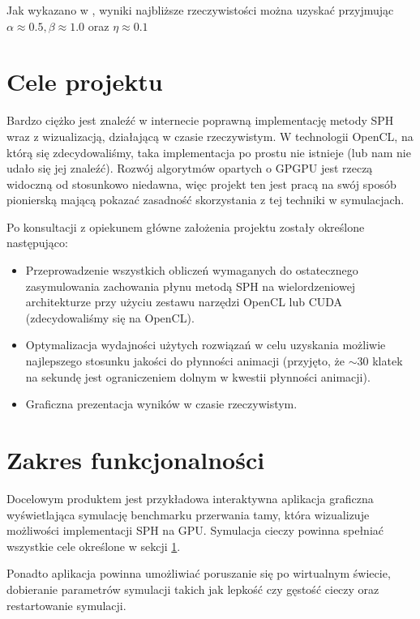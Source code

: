 \documentclass[polish, 12pt]{aghthesis}
\begin{document}
			Jak wykazano w \cite{Lombardi}, wyniki najbliższe rzeczywistości można uzyskać przyjmując $\alpha \approx 0.5, \beta \approx 1.0$ oraz $\eta \approx 0.1$

\section{Cele projektu}
\label{sec:cele}

Bardzo ciężko jest znaleźć w internecie poprawną implementację metody SPH wraz z wizualizacją, działającą w czasie rzeczywistym. W technologii OpenCL, na którą się zdecydowaliśmy, taka implementacja po prostu nie istnieje (lub nam nie udało się jej znaleźć). Rozwój algorytmów opartych o GPGPU jest rzeczą widoczną od stosunkowo niedawna, więc projekt ten jest pracą na swój sposób pionierską mającą pokazać zasadność skorzystania z tej techniki w symulacjach.
		
	Po konsultacji z opiekunem główne założenia projektu zostały określone następująco:
	
	\begin{itemize}
	
		\item Przeprowadzenie wszystkich obliczeń wymaganych do ostatecznego zasymulowania zachowania płynu metodą SPH na wielordzeniowej architekturze przy użyciu zestawu narzędzi OpenCL lub CUDA (zdecydowaliśmy się na OpenCL).
				
		\item Optymalizacja wydajności użytych rozwiązań w celu uzyskania możliwie najlepszego stosunku jakości do płynności animacji (przyjęto, że $\sim 30$ klatek na sekundę jest ograniczeniem dolnym w kwestii płynności animacji).
		
		\item Graficzna prezentacja wyników w czasie rzeczywistym.
		
	\end{itemize}
	
\section{Zakres funkcjonalności}
	
	Docelowym produktem jest przykładowa interaktywna aplikacja graficzna wyświetlająca symulację benchmarku przerwania tamy, która wizualizuje możliwości implementacji SPH na GPU. Symulacja cieczy powinna spełniać wszystkie cele określone w sekcji \ref{sec:cele}.
	
		Ponadto aplikacja powinna umożliwiać poruszanie się po wirtualnym świecie, dobieranie parametrów symulacji takich jak lepkość czy gęstość cieczy oraz restartowanie symulacji.
	
\end{document}
